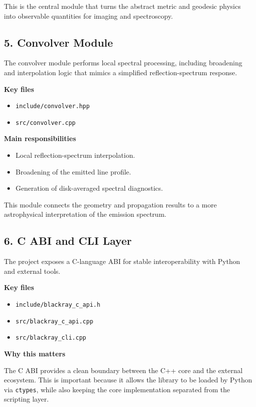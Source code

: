 \documentclass[11pt]{article}
\begin{document}
This is the central module that turns the abstract metric and geodesic physics into observable quantities for imaging and spectroscopy.

\subsection{5. Convolver Module}

The convolver module performs local spectral processing, including broadening and interpolation logic that mimics a simplified reflection-spectrum response.

\textbf{Key files}

\begin{itemize}[leftmargin=1.5em]
    \item \texttt{include/convolver.hpp}
    \item \texttt{src/convolver.cpp}
\end{itemize}

\textbf{Main responsibilities}

\begin{itemize}[leftmargin=1.5em]
    \item Local reflection-spectrum interpolation.
    \item Broadening of the emitted line profile.
    \item Generation of disk-averaged spectral diagnostics.
\end{itemize}

This module connects the geometry and propagation results to a more astrophysical interpretation of the emission spectrum.

\subsection{6. C ABI and CLI Layer}

The project exposes a C-language ABI for stable interoperability with Python and external tools.

\textbf{Key files}

\begin{itemize}[leftmargin=1.5em]
    \item \texttt{include/blackray_c_api.h}
    \item \texttt{src/blackray_c_api.cpp}
    \item \texttt{src/blackray_cli.cpp}
\end{itemize}

\textbf{Why this matters}

The C ABI provides a clean boundary between the C++ core and the external ecosystem. This is important because it allows the library to be loaded by Python via \texttt{ctypes}, while also keeping the core implementation separated from the scripting layer.
\end{document}
